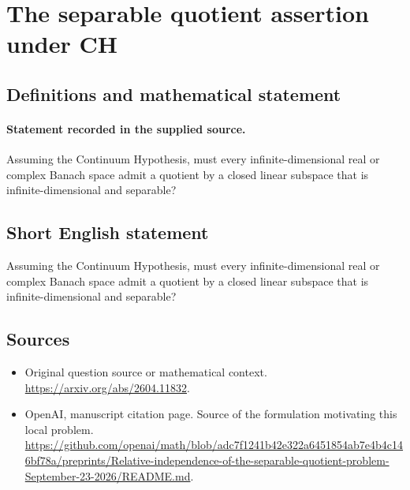 \documentclass[11pt]{article}
\begin{document}
\section*{The separable quotient assertion under CH}\label{30007185}
\subsection{Definitions and mathematical statement}
\paragraph{Statement recorded in the supplied source.}
Assuming the Continuum Hypothesis, must every infinite-dimensional real or complex Banach space admit a quotient by a closed linear subspace that is infinite-dimensional and separable?
\subsection{Short English statement}
Assuming the Continuum Hypothesis, must every infinite-dimensional real or complex Banach space admit a quotient by a closed linear subspace that is infinite-dimensional and separable?
\subsection{Sources}
\begin{itemize}
\item[S1] Original question source or mathematical context.
\url{https://arxiv.org/abs/2604.11832}.
\item[S2] OpenAI, manuscript citation page. Source of the formulation motivating this local problem.
\url{https://github.com/openai/math/blob/adc7f1241b42e322a6451854ab7e4b4c146bf78a/preprints/Relative-independence-of-the-separable-quotient-problem-September-23-2026/README.md}.
\end{itemize}
\end{document}
